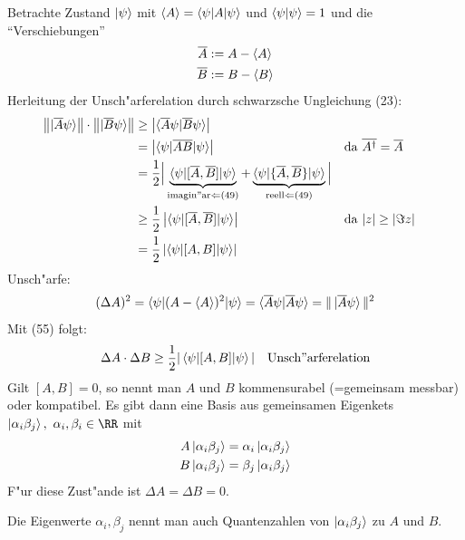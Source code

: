 \documentclass[a4paper]{scrartcl}
\begin{document}
{Betrachte Zustand $\ket \psi$ mit $\braket A = \braket { \psi | A | \psi }$ und $\braket {\psi |\psi }=1$ und die "`Verschiebungen"'
\begin{align}
\begin{split}
\overline A & := A - \braket A \\
\overline B & := B - \braket B 
\end{split}
\end{align}
Herleitung der Unsch"arferelation durch schwarzsche Ungleichung (23):
\begin{align}
\left\Vert \ket { \overline A \psi } \right\Vert \cdot \left\Vert \ket { \overline B \psi }  \right\Vert & \geq \left\vert \braket { \overline A \psi | \overline B \psi } \right\vert \notag\\
& = \left\vert \braket{ \psi | \overline A \overline B | \psi } \right \vert &&  \mathrm{da \ } \overline{ A ^\dagger} = \overline A \notag\\
&  = \frac12 \Big\vert \underbrace{ \braket{ \psi | [\overline A, \overline B ] | \psi}}_{\mathrm{imagin"ar} \Leftarrow \mathrm{(49)}} + \underbrace{\braket { \psi | \{ \overline A, \overline B \} | \psi }}_{\mathrm{reell} \Leftarrow \mathrm{(49)}} \Big\vert \notag\\
& \geq \frac12 \left\vert \braket{\psi | [\overline A, \overline B] | \psi} \right\vert && \mathrm{da \ } \vert z \vert \geq \vert \Im z \vert \notag\\
& = \frac12 \left\vert \braket { \psi | [A,B] | \psi } \right\vert
\end{align}
Unsch"arfe:
$$(\Delta A)^2 = \braket{ \psi | (A - \braket A )^2 | \psi } = \braket{ \overline A \psi | \overline A \psi } = \Vert \ket { \overline A \psi } \Vert^2$$
Mit (55) folgt:
\begin{align} \Delta A \cdot \Delta B \geq \frac12 \vert \braket{ \psi | [A,B] | \psi } \vert \quad \mathrm{Unsch"arferelation} \end{align}
Gilt $[A,B] = 0$, so nennt man $A$ und $B$ kommensurabel (=gemeinsam messbar) oder kompatibel. Es gibt dann eine Basis aus gemeinsamen Eigenkets $\ket { \alpha_i \beta_j }, \ \alpha_i, \beta_i \in \RR$ mit
\begin{align*}
A \ket{ \alpha_i \beta_j } & = \alpha_i \ket{ \alpha_i \beta_j } \\
B \ket{ \alpha_i \beta_j } & = \beta_j \ket{ \alpha_i \beta_j}
\end{align*}
F"ur diese Zust"ande ist $\Delta A = \Delta B = 0$. 

Die Eigenwerte $\alpha_i, \beta_j$ nennt man auch Quantenzahlen von $\ket{ \alpha_i \beta_j}$ zu $A$ und $B$.

}
\end{document}
